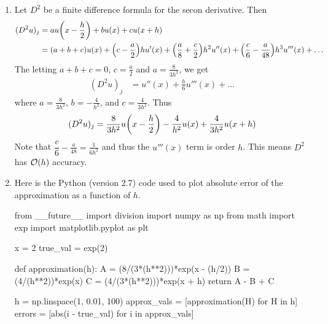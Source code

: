 \documentclass{article} %
\theoremstyle{plain}
\numberwithin{equation}{section} %
\numberwithin{figure}{section} %
\numberwithin{table}{section} %
\begin{document}
\begin{enumerate}[\ \ (a)]
    \item
        Let $D^2$ be a finite difference formula for the secon derivative.  Then
        \begin{align*}
            (D^2u)_j &= au\qty(x - \frac{h}{2}) + bu\qty(x) + cu\qty(x + h) \\
            &= (a + b + c)u(x) + \qty(c - \frac{a}{2})hu'(x) + \qty(\frac{a}{8} + \frac{c}{2})h^2 u''(x) + \qty(\frac{c}{6} - \frac{a}{48})h^3u'''(x) + \dots
        \end{align*}
        The letting $a + b + c = 0$, $c = \frac{a}{2}$ and $a = \frac{8}{3h^2}$, we get
        \begin{align*}
            (D^2u)_j &= u''(x) + \frac{h}{6}u'''(x) + \dots
        \end{align*}
        where $a = \frac{8}{3h^2}$, $b = -\frac{4}{h^2}$, and $c = \frac{4}{3h^2}$.  Thus
        \begin{align*}
            (D^2 u)_j = \frac{8}{3h^2}u\qty(x - \frac{h}{2}) - \frac{4}{h^2}u(x) + \frac{4}{3h^2}u(x + h)
        \end{align*}
        Note that $\dfrac{c}{6} - \frac{a}{48} = \frac{1}{6h^2}$ and thus the $u'''(x)$ term is order $h$.  This means $D^2$ has $\order{h}$ accuracy.
    \item
        Here is the Python (version 2.7) code used to plot absolute error of the approximation as a function of $h$.
        \begin{code}
from __future__ import division
import numpy as np
from math import exp
import matplotlib.pyplot as plt

x = 2
true_val = exp(2)

def approximation(h):
    A = (8/(3*(h**2)))*exp(x - (h/2))
    B = (4/(h**2))*exp(x)
    C = (4/(3*(h**2)))*exp(x + h)
    return A - B + C

h = np.linspace(1, 0.01, 100)
approx_vals = [approximation(H) for H in h]
errors = [abs(i - true_val) for i in approx_vals]


\end{code}
\end{enumerate}
\end{document}
